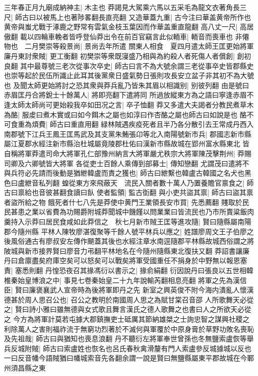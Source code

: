 三年春正月九廟成納神主|{
	木主也}
莽謁見大駕乘六馬以五采毛為龍文衣著角長三尺|{
	師古曰以被馬上也著陟畧翻長直亮翻}
又造華蓋九重|{
	古今注曰華盖黄帝所作也黄帝與蚩尤戰于涿鹿之野常有雲氣金枝玉葉因而作華盖重直龍翻}
高八丈一尺|{
	高居傲翻}
載以四輪車輓者皆呼登仙莽出令在前百官竊言此似輀車|{
	輀音而喪車也}
非僊物也　二月樊崇等殺景尚|{
	景尚去年所遣}
關東人相食　夏四月遣太師王匡更始將軍廉丹東討衆賊|{
	更工衡翻}
初樊崇等衆既寖盛乃相與為約殺人者死傷人者償創|{
	創初良翻}
其中最尊號三老次從事次卒史|{
	師古曰言不為大號余謂三老從事卒史皆郡縣史也崇等起於民伍所識止此耳其後黨衆日盛氣勢日張則攻長安立盆子非其初不為大號也}
及聞太師更始將討之恐其衆與莽兵亂乃皆朱其眉以相識别|{
	别彼列翻}
由是號曰赤眉匡丹合將銳士十餘萬人|{
	將即亮翻下遣將同}
所過放縱東方為之語曰寧逢赤眉不逢太師太師尚可更始殺我卒如田况之言|{
	卒子恤翻}
莽又多遣大夫謁者分教民煮草木為酪|{
	服䖍曰煮木實或曰如今餌木之屬也如淳曰作杏酪之屬也師古曰如說是也}
酪不可食重為煩費|{
	師古曰重直用翻}
緑林賊遇疾疫死者且半乃各分散引去王常成丹西入南郡號下江兵王鳳王匡馬武及其支黨朱鮪張卬等北入南陽號新市兵|{
	郡國志新市縣屬江夏郡水經注新市縣治杜城屬竟陵郡杜佑曰漢新市縣故城在郢州富水縣東北}
皆自稱將軍莽遣司命大將軍孔仁部豫州納言大將軍嚴尤秩宗大將軍陳茂擊荆州|{
	莽賜司卿及六卿號皆大將軍}
各從吏士百餘人乘傳到部募士|{
	傳知戀翻}
尤謂茂曰遣將不與兵符必先請而後動是猶紲韓盧而責之獲也|{
	師古曰紲繫也韓盧古韓國之名犬也黑色曰盧紲音私列翻}
蝗從東方來飛蔽天　流民入關者數十萬人乃置養贍官禀食之|{
	師古曰禀給也音彼甚翻食讀曰飤}
使者監領|{
	監古衘翻}
與小吏共盜其禀|{
	師古曰盜其禀者盜所給之物}
餓死者什七八先是莽使中黄門王業領長安市買|{
	先悉薦翻}
賤取於民民甚患之業以省費為功賜爵附城莽聞城中饑饉以問業業曰皆流民也乃市所賣粱飯肉羹持入示莽曰居民食咸如此莽信之　秋七月新市賊王匡等進攻隨|{
	賢曰隨縣屬南陽郡今隨州縣}
平林人陳牧廖湛復聚等千餘人號平林兵以應之|{
	姓譜廖周文王子伯廖之後風俗通古有廖叔安左傳作颶蓋其後也水經注章水南逕隨郡平林縣故城西俗謂之將陂城與新市接界賢曰廖音力弔翻平林地名在今隨州隨縣東北復扶又翻}
莽詔書讓廉丹曰倉廪盡矣府庫空矣可以怒矣可以戰矣將軍受國重任不捐身於中野無以報恩塞責|{
	塞悉則翻}
丹惶恐夜召其掾馮衍以書示之|{
	掾俞絹翻}
衍因說丹曰張良以五世相韓椎秦始皇博浪之中|{
	事見七卷秦始皇二十九年說輸芮翻相息亮翻}
將軍之先為漢信臣|{
	賢曰廉褒襄武人宣帝時為後將軍即丹之先}
新室之興英俊不附今海内潰亂人懷漢德甚於周人思召公也|{
	召公之教明於南國周人思之為賦甘棠召音邵}
人所歌舞天必從之|{
	賢曰詩小雅曰雖無德與女式歌且舞言漢氏之德人歌舞之也書曰人之所欲天必從之}
今方為將軍計莫若屯據大郡鎮撫吏士砥厲其節納雄桀之士詢忠智之謀興社稷之利除萬人之害則福祚流于無窮功烈著於不滅何與軍覆於中原身膏於草野功敗名喪恥及先祖哉|{
	師古曰與猶知也喪息浪翻}
丹不聽衍左將軍奉世曾孫也冬無鹽索盧恢等舉兵反城附賊|{
	師古曰索盧姓也恢名也呂氏春秋禽滑釐有門人索盧參反城據城以反也一曰反音幡今語賊猶曰幡城索音先各翻余謂一說是賢曰無鹽縣屬東平郡故城在今鄆州須昌縣之東}
